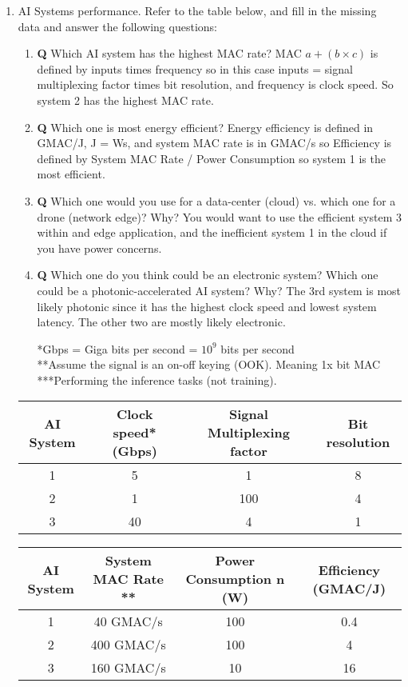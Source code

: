 \documentclass[main.tex]{subfiles}
\begin{document}
\begin{enumerate}
    \item AI Systems performance. Refer to the table below, and fill in the missing data and answer the following questions:
    \begin{enumerate}
    \item \textbf{Q} Which AI system has the highest MAC rate?  MAC $a+(b \times c)$ is defined by inputs times frequency so in this case inputs = signal multiplexing factor times bit resolution, and frequency is clock speed. So system 2 has the highest MAC rate. 
    \item \textbf{Q} Which one is most energy efficient?  Energy efficiency is defined in GMAC/J, J = Ws, and system MAC rate is in GMAC/s so Efficiency is defined by System MAC Rate / Power Consumption so system 1 is the most efficient. 
    \item \textbf{Q} Which one would you use for a data-center (cloud) vs. which one for a drone (network edge)? Why? You would want to use the efficient system 3 within and edge application, and the inefficient system 1 in the cloud if you have power concerns.
    \item \textbf{Q} Which one do you think could be an electronic system? Which one could be a photonic-accelerated AI system? Why? The 3rd system is most likely photonic since it has the highest clock speed and lowest system latency. The other two are mostly likely electronic.
    
    *Gbps = Giga bits per second = $10^9$ bits per second\\
    **Assume the signal is an on-off keying (OOK). Meaning 1x bit MAC\\
    ***Performing the inference tasks (not training).\\
    
    \end{enumerate}
    \begin{center}
    \begin{tabular}{||c c c c||} 
     \hline
     AI System & Clock speed* (Gbps) & Signal Multiplexing factor & Bit resolution \\ [0.5ex] 
     \hline\hline
     1 & 5 & 1 & 8 \\ 
     \hline
     2 & 1 & 100 & 4 \\
     \hline
     3 & 40 & 4 & 1 \\ [1ex] 
     \hline
    \end{tabular}
    \end{center}
    
    \begin{center}
    \begin{tabular}{||c c c c||} 
     \hline
     AI System & System MAC Rate ** & Power Consumption n (W) & Efficiency (GMAC/J) \\ [0.5ex] 
     \hline\hline
     1 & 40 GMAC/s & 100 & 0.4 \\ 
     \hline
     2 & 400 GMAC/s & 100 & 4 \\
     \hline
     3 & 160 GMAC/s & 10 & 16 \\ [1ex] 
     \hline
    \end{tabular}
    \end{center}
    

\end{enumerate}
\end{document}

